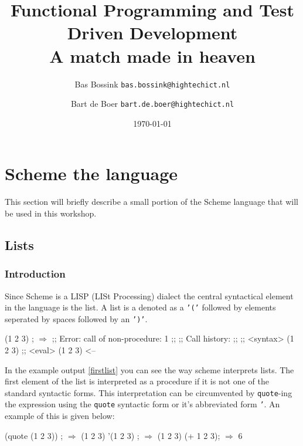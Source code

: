 \documentclass[12pt,a4paper,english,twoside]{article}
\author{
    Bas Bossink \texttt{bas.bossink@hightechict.nl}
    \and
    Bart de Boer \texttt{bart.de.boer@hightechict.nl}
}
\date{\today}
\title{Functional Programming and Test Driven Development\\
\vspace{2 mm} {\large A match made in heaven}}
\begin{document}
\maketitle
\section{Scheme the language}
This section will briefly describe a small portion of the Scheme language that will be used in this workshop.
\subsection{Lists}
\subsubsection{Introduction}
Since Scheme is a LISP (LISt Processing) dialect the central syntactical element in the language is the list. A list is a denoted as a \texttt{'('} followed by elements seperated by spaces followed by an \texttt{')'}.

\begin{listing}
\label{firstlist}
\begin{schemecode}
(1 2 3) ; $\Rightarrow$ 
;;	Error: call of non-procedure: 1
;;
;;	Call history:
;;
;;	<syntax>	  (1 2 3)
;;	<eval>	  (1 2 3)	<--

\end{schemecode}
\caption{Example output of the evaluation of a list by a Scheme interperter}
\end{listing}

In the example output \ref{firstlist} you can see the way scheme interprets lists. The first element of the list is interpreted as a procedure if it is not one of the standard syntactic forms. This interpretation can be circumvented by \texttt{quote}-ing the expression using the \texttt{quote} syntactic form or it's abbreviated form \texttt{'}. An example of this is given below:
\begin{listing}
\label{quotedlist}
\begin{schemecode}
(quote (1 2 3)) ; $\Rightarrow$ (1 2 3)
'(1 2 3) ; $\Rightarrow$ (1 2 3)
(+ 1 2 3); $\Rightarrow$ 6
\end{schemecode}
\caption{Example output of the evaluation of a quoted list by a Scheme interperter}
\end{listing}
\end{document}
